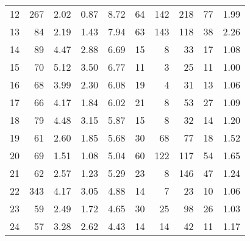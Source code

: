 \begin{tabular}{rrrrrrrrrr}
12 &      267 &           2.02 &           0.87 &          8.72 &              64 &             142 &                   218 &                       77 &       1.99 \\
13 &       84 &           2.19 &           1.43 &          7.94 &              63 &             143 &                   118 &                       38 &       2.26 \\
14 &       89 &           4.47 &           2.88 &          6.69 &              15 &               8 &                    33 &                       17 &       1.08 \\
15 &       70 &           5.12 &           3.50 &          6.77 &              11 &               3 &                    25 &                       11 &       1.00 \\
16 &       68 &           3.99 &           2.30 &          6.08 &              19 &               4 &                    31 &                       13 &       1.06 \\
17 &       66 &           4.17 &           1.84 &          6.02 &              21 &               8 &                    53 &                       27 &       1.09 \\
18 &       79 &           4.48 &           3.15 &          5.87 &              15 &               8 &                    32 &                       14 &       1.20 \\
19 &       61 &           2.60 &           1.85 &          5.68 &              30 &              68 &                    77 &                       18 &       1.52 \\
20 &       69 &           1.51 &           1.08 &          5.04 &              60 &             122 &                   117 &                       54 &       1.65 \\
21 &       62 &           2.57 &           1.23 &          5.29 &              23 &               8 &                   146 &                       47 &       1.24 \\
22 &      343 &           4.17 &           3.05 &          4.88 &              14 &               7 &                    23 &                       10 &       1.06 \\
23 &       59 &           2.49 &           1.72 &          4.65 &              30 &              25 &                    98 &                       26 &       1.03 \\
24 &       57 &           3.28 &           2.62 &          4.43 &              14 &              14 &                    42 &                       11 &       1.17 \\

\end{tabular}
